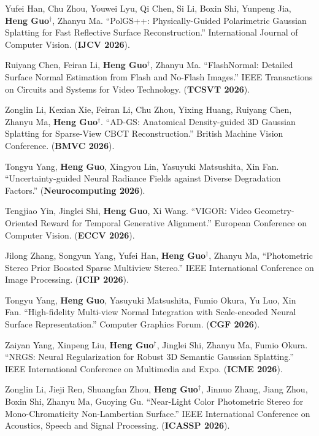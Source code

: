 
\begin{enumerate}[label={[\arabic*]}]
	\item Yufei Han, Chu Zhou, Youwei Lyu, Qi Chen, Si Li, Boxin Shi, Yunpeng Jia, \textbf{Heng Guo}$^\dagger$, Zhanyu Ma. ``PolGS++: Physically-Guided Polarimetric Gaussian Splatting for Fast Reflective Surface Reconstruction.'' International Journal of Computer Vision. (\textbf{IJCV 2026}).
	\item Ruiyang Chen, Feiran Li, \textbf{Heng Guo}$^\dagger$, Zhanyu Ma. ``FlashNormal: Detailed Surface Normal Estimation from Flash and No-Flash Images.'' IEEE Transactions on Circuits and Systems for Video Technology. (\textbf{TCSVT 2026}).
	\item Zonglin Li, Kexian Xie, Feiran Li, Chu Zhou, Yixing Huang, Ruiyang Chen, Zhanyu Ma, \textbf{Heng Guo}$^\dagger$. ``AD-GS: Anatomical Density-guided 3D Gaussian Splatting for Sparse-View CBCT Reconstruction.'' British Machine Vision Conference. (\textbf{BMVC 2026}).
	\item Tongyu Yang, \textbf{Heng Guo}, Xingyou Lin, Yasuyuki Matsushita, Xin Fan. ``Uncertainty-guided Neural Radiance Fields against Diverse Degradation Factors.'' (\textbf{Neurocomputing 2026}).
	\item Tengjiao Yin, Jinglei Shi, \textbf{Heng Guo}, Xi Wang. ``VIGOR: Video Geometry-Oriented Reward for Temporal Generative Alignment.'' European Conference on Computer Vision. (\textbf{ECCV 2026}).
	\item Jilong Zhang, Songyun Yang, Yufei Han, \textbf{Heng Guo}$^\dagger$, Zhanyu Ma, ``Photometric  Stereo Prior Boosted Sparse Multiview Stereo.'' IEEE International Conference on Image Processing. (\textbf{ICIP 2026}).
	\item Tongyu Yang, \textbf{Heng Guo}, Yasuyuki Matsushita, Fumio Okura, Yu Luo, Xin Fan. ``High-fidelity Multi-view Normal Integration with Scale-encoded Neural Surface Representation.'' Computer Graphics Forum. (\textbf{CGF 2026}).
	\item Zaiyan Yang, Xinpeng Liu, \textbf{Heng Guo}$^\dagger$, Jinglei Shi, Zhanyu Ma, Fumio Okura. ``NRGS: Neural Regularization for Robust 3D Semantic Gaussian Splatting.'' IEEE International Conference on Multimedia and Expo. (\textbf{ICME 2026}).
	\item Zonglin Li, Jieji Ren, Shuangfan Zhou, \textbf{Heng Guo}$^\dagger$, Jinnuo Zhang, Jiang Zhou, Boxin Shi, Zhanyu Ma, Guoying Gu. ``Near-Light Color Photometric Stereo for Mono-Chromaticity Non-Lambertian Surface.'' IEEE International Conference on Acoustics, Speech and Signal Processing. (\textbf{ICASSP 2026}).

\end{enumerate}
